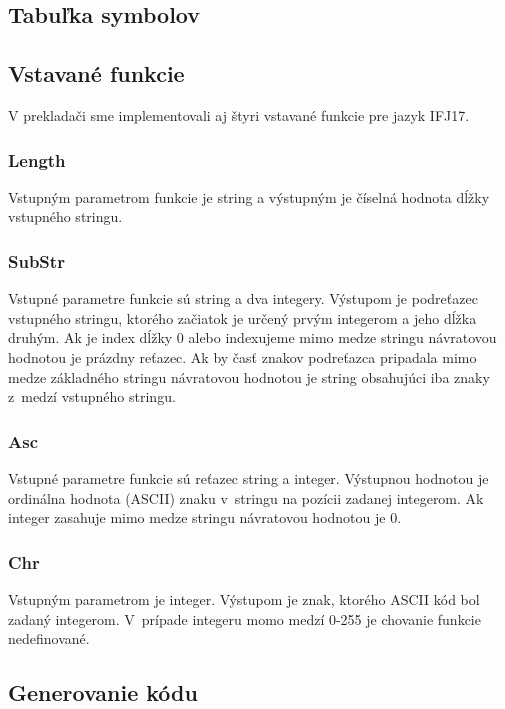 \documentclass{article}
\begin{document}
        \subsection{Tabuľka symbolov}
        
        \subsection{Vstavané funkcie}
            V prekladači sme implementovali aj štyri vstavané funkcie pre jazyk IFJ17.
            
            \subsubsection{Length}
            Vstupným parametrom funkcie je string a výstupným je číselná hodnota dĺžky vstupného stringu.
            
            \subsubsection{SubStr}
            Vstupné parametre funkcie sú string  a dva integery. Výstupom je podreťazec vstupného
            stringu, ktorého začiatok je určený prvým integerom a jeho dĺžka druhým. Ak je index dĺžky
            0 alebo indexujeme mimo medze stringu návratovou hodnotou je prázdny reťazec. Ak by časť 
            znakov podreťazca pripadala mimo medze základného stringu návratovou hodnotou je string
            obsahujúci iba znaky z~medzí vstupného stringu.
            
            \subsubsection{Asc}
            Vstupné parametre funkcie sú reťazec string a integer. Výstupnou hodnotou je ordinálna
            hodnota (ASCII) znaku v~stringu na pozícii zadanej integerom. Ak integer zasahuje mimo 
            medze stringu návratovou hodnotou je 0.
            
            \subsubsection{Chr}
            Vstupným parametrom je integer. Výstupom je znak, ktorého ASCII kód bol zadaný integerom.
            V~prípade integeru momo medzí 0-255 je chovanie funkcie nedefinované.
            
        \subsection{Generovanie kódu}
        
\end{document}
